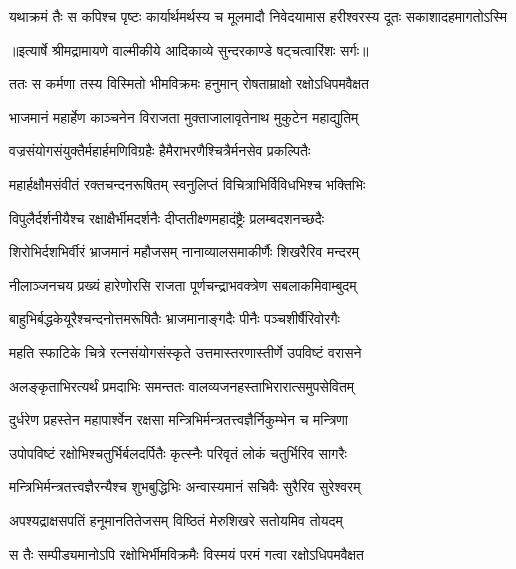 \fourlineindentedshloka
{यथाक्रमं तैः स कपिश्च पृष्टः}
{कार्यार्थमर्थस्य च मूलमादौ}
{निवेदयामास हरीश्वरस्य}
{दूतः सकाशादहमागतोऽस्मि} %


{॥इत्यार्षे श्रीमद्रामायणे वाल्मीकीये आदिकाव्ये सुन्दरकाण्डे षट्चत्वारिंशः सर्गः॥}


\twolineshloka
{ततः स कर्मणा तस्य विस्मितो भीमविक्रमः}
{हनुमान् रोषताम्राक्षो रक्षोऽधिपमवैक्षत} %

\twolineshloka
{भाजमानं महार्हेण काञ्चनेन विराजता}
{मुक्ताजालावृतेनाथ मुकुटेन महाद्युतिम्} %

\twolineshloka
{वज्रसंयोगसंयुक्तैर्महार्हमणिविग्रहैः}
{हैमैराभरणैश्चित्रैर्मनसेव प्रकल्पितैः} %

\twolineshloka
{महार्हक्षौमसंवीतं रक्तचन्दनरूषितम्}
{स्वनुलिप्तं विचित्राभिर्विविधभिश्च भक्तिभिः} %

\twolineshloka
{विपुलैर्दर्शनीयैश्च रक्षाक्षैर्भीमदर्शनैः}
{दीप्ततीक्ष्णमहादंष्ट्रैः प्रलम्बदशनच्छदैः} %

\twolineshloka
{शिरोभिर्दशभिर्वीरं भ्राजमानं महौजसम्}
{नानाव्यालसमाकीर्णैः शिखरैरिव मन्दरम्} %

\twolineshloka
{नीलाञ्जनचय प्रख्यं हारेणोरसि राजता}
{पूर्णचन्द्राभवक्त्रेण सबलाकमिवाम्बुदम्} %

\twolineshloka
{बाहुभिर्बद्धकेयूरैश्चन्दनोत्तमरूषितैः}
{भ्राजमानाङ्गदैः पीनैः पञ्चशीर्षैरिवोरगैः} %

\twolineshloka
{महति स्फाटिके चित्रे रत्नसंयोगसंस्कृते}
{उत्तमास्तरणास्तीर्णे उपविष्टं वरासने} %

\twolineshloka
{अलङ्कृताभिरत्यर्थं प्रमदाभिः समन्ततः}
{वालव्यजनहस्ताभिरारात्समुपसेवितम्} %

\twolineshloka
{दुर्धरेण प्रहस्तेन महापार्श्वेन रक्षसा}
{मन्त्रिभिर्मन्त्रतत्त्वज्ञैर्निकुम्भेन च मन्त्रिणा} %

\twolineshloka
{उपोपविष्टं रक्षोभिश्चतुर्भिर्बलदर्पितैः}
{कृत्स्नैः परिवृतं लोकं चतुर्भिरिव सागरैः} %

\twolineshloka
{मन्त्रिभिर्मन्त्रतत्त्वज्ञैरन्यैश्च शुभबुद्धिभिः}
{अन्वास्यमानं सचिवैः सुरैरिव सुरेश्वरम्} %

\twolineshloka
{अपश्यद्राक्षसपतिं हनूमानतितेजसम्}
{विष्ठितं मेरुशिखरे सतोयमिव तोयदम्} %

\twolineshloka
{स तैः सम्पीड्यमानोऽपि रक्षोभिर्भीमविक्रमैः}
{विस्मयं परमं गत्वा रक्षोऽधिपमवैक्षत} %

